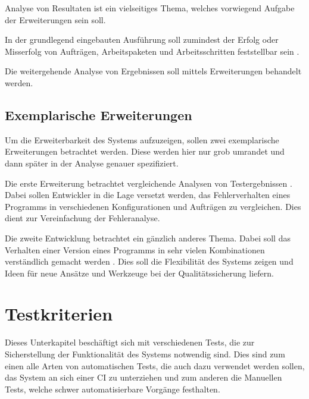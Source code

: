 Analyse von Resultaten ist ein vielseitiges Thema,
welches vorwiegend Aufgabe der Erweiterungen sein soll.

In der grundlegend eingebauten Ausf\"uhrung soll zumindest der Erfolg oder Misserfolg
von Auftr\"agen, Arbeitspaketen und Arbeitsschritten feststellbar sein .

Die weitergehende Analyse von Ergebnissen soll mittels Erweiterungen behandelt werden.

\subsection{Exemplarische Erweiterungen}

Um die Erweiterbarkeit des Systems aufzuzeigen,
sollen zwei exemplarische Erweiterungen betrachtet werden.
Diese werden hier nur grob umrandet und dann sp\"ater in der Analyse genauer spezifiziert.

Die erste Erweiterung betrachtet vergleichende Analysen von Testergebnissen .
Dabei sollen Entwickler in die Lage versetzt werden,
das Fehlerverhalten eines Programms in verschiedenen Konfigurationen und Auftr\"agen zu vergleichen.
Dies dient zur Vereinfachung der Fehleranalyse.

Die zweite Entwicklung betrachtet ein gänzlich anderes Thema.
Dabei soll das Verhalten einer Version eines Programms
in sehr vielen Kombinationen verst\"andlich gemacht werden .
Dies soll die Flexibilit\"at des Systems zeigen und
Ideen f\"ur neue Ans\"atze und Werkzeuge bei der Qualit\"atssicherung liefern.





\section{Testkriterien}

Dieses Unterkapitel beschäftigt sich mit verschiedenen Tests,
die zur Sicherstellung der Funktionalität des Systems notwendig sind.
Dies sind zum einen alle Arten von automatischen Tests,
die auch dazu verwendet werden sollen, das System an sich einer \ac{CI} zu unterziehen
und zum anderen die Manuellen Tests, welche schwer automatisierbare Vorgänge festhalten.



